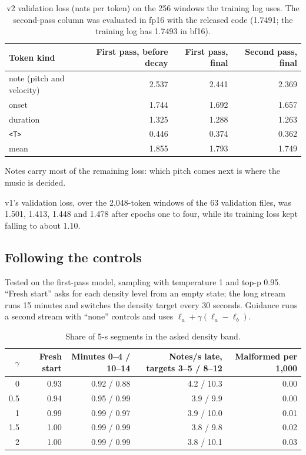\documentclass[11pt,a4paper]{article}
\begin{document}
\begin{table}[h]
\centering\small
\begin{tabular}{lrrr}
\toprule
Token kind & First pass, before decay & First pass, final & Second pass, final \\
\midrule
note (pitch and velocity) & 2.537 & 2.441 & 2.369 \\
onset & 1.744 & 1.692 & 1.657 \\
duration & 1.325 & 1.288 & 1.263 \\
\texttt{<T>} & 0.446 & 0.374 & 0.362 \\
mean & 1.855 & 1.793 & 1.749 \\
\bottomrule
\end{tabular}
\caption{v2 validation loss (nats per token) on the 256 windows the training log uses. The second-pass column
was evaluated in fp16 with the released code (1.7491; the training log has 1.7493 in bf16).}
\end{table}

Notes carry most of the remaining loss: which pitch comes next is where the music is decided.

v1's validation loss, over the 2,048-token windows of the 63 validation files, was 1.501, 1.413, 1.448 and 1.478
after epochs one to four, while its training loss kept falling to about 1.10.

\subsection{Following the controls}

Tested on the first-pass model, sampling with temperature 1 and top-p 0.95. ``Fresh start'' asks for each
density level from an empty state; the long stream runs 15 minutes and switches the density target every 30
seconds. Guidance runs a second stream with ``none'' controls and uses $\ell_a + \gamma(\ell_a - \ell_b)$.

\begin{table}[h]
\centering\small
\begin{tabular}{rrrrr}
\toprule
$\gamma$ & Fresh start & Minutes 0--4 / 10--14 & Notes/s late, targets 3--5 / 8--12 & Malformed per 1,000 \\
\midrule
0 & 0.93 & 0.92 / 0.88 & 4.2 / 10.3 & 0.00 \\
0.5 & 0.94 & 0.95 / 0.99 & 3.9 / 9.9 & 0.00 \\
1 & 0.99 & 0.99 / 0.97 & 3.9 / 10.0 & 0.01 \\
1.5 & 1.00 & 0.99 / 0.99 & 3.8 / 9.8 & 0.02 \\
2 & 1.00 & 0.99 / 0.99 & 3.8 / 10.1 & 0.03 \\
\bottomrule
\end{tabular}
\caption{Share of 5-s segments in the asked density band.}
\end{table}
\end{document}
